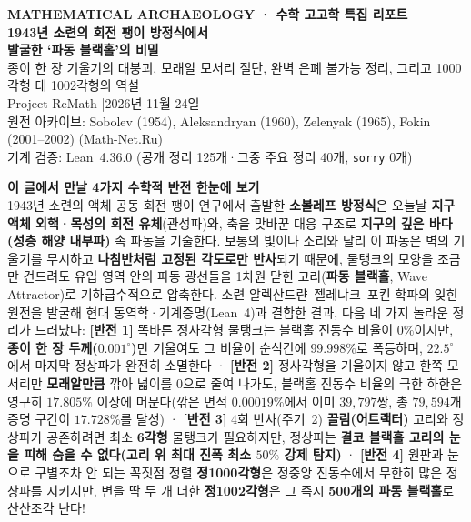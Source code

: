 \documentclass[11pt,a4paper]{article}
\begin{document}
\begin{center}
  {\sffamily\footnotesize\bfseries\color{teal} MATHEMATICAL ARCHAEOLOGY · 수학 고고학 특집 리포트}\\[0.55em]
  {\sffamily\huge\bfseries\color{navy} 1943년 소련의 회전 팽이 방정식에서\\[0.18em] 발굴한 `파동 블랙홀'의 비밀}\\[0.5em]
  {\sffamily\large\color{darkgray} 종이 한 장 기울기의 대붕괴, 모래알 모서리 절단, 완벽 은폐 불가능 정리, 그리고 1000각형 대 1002각형의 역설}\\[0.9em]
  {\sffamily\small Project ReMath \quad|\quad 2026년 11월 24일}\\[0.25em]
  {\footnotesize\color{gray} 원전 아카이브: Sobolev (1954), Aleksandryan (1960), Zelenyak (1965), Fokin (2001--2002) (Math-Net.Ru)\\기계 검증: Lean~4.36.0 (공개 정리 125개·그중 주요 정리 40개, \texttt{sorry} 0개)}
\end{center}

\vspace{0.35em}

\begin{tcolorbox}[colback=softbg,colframe=navy,boxrule=0.7pt,arc=3pt,left=12pt,right=12pt,top=8pt,bottom=8pt]
\textbf{\sffamily 이 글에서 만날 4가지 수학적 반전 한눈에 보기}\\[0.25em]
1943년 소련의 액체 공동 회전 팽이 연구에서 출발한 \textbf{소볼레프 방정식}은 오늘날 \textbf{지구 액체 외핵·목성의 회전 유체}(관성파)와, 축을 맞바꾼 대응 구조로 \textbf{지구의 깊은 바다(성층 해양 내부파)} 속 파동을 기술한다. 보통의 빛이나 소리와 달리 이 파동은 벽의 기울기를 무시하고 \textbf{나침반처럼 고정된 각도로만 반사}되기 때문에, 물탱크의 모양을 조금만 건드려도 유입 영역 안의 파동 광선들을 1차원 닫힌 고리(\textbf{파동 블랙홀}, Wave Attractor)로 기하급수적으로 압축한다. 소련 알렉산드랸--젤레냐크--포킨 학파의 잊힌 원전을 발굴해 현대 동역학·기계증명(Lean~4)과 결합한 결과, 다음 네 가지 놀라운 정리가 드러났다:
\textbf{[반전 1]} 똑바른 정사각형 물탱크는 블랙홀 진동수 비율이 $0\%$이지만, \textbf{종이 한 장 두께($0.001^\circ$)}만 기울여도 그 비율이 순식간에 \textbf{$99.998\%$}로 폭등하며, $22.5^\circ$에서 마지막 정상파가 완전히 소멸한다 ·
\textbf{[반전 2]} 정사각형을 기울이지 않고 한쪽 모서리만 \textbf{모래알만큼} 깎아 넓이를 $0$으로 줄여 나가도, 블랙홀 진동수 비율의 극한 하한은 영구히 \textbf{$17.805\%$} 이상에 머문다(깎은 면적 $0.00019\%$에서 이미 $39{,}797$쌍, 총 $79{,}594$개 증명 구간이 $17.728\%$를 달성) ·
\textbf{[반전 3]} 4회 반사(주기~2) \textbf{끌림(어트랙터)} 고리와 정상파가 공존하려면 최소 \textbf{6각형} 물탱크가 필요하지만, 정상파는 \textbf{결코 블랙홀 고리의 눈을 피해 숨을 수 없다(고리 위 최대 진폭 최소 $50\%$ 강제 탐지)} ·
\textbf{[반전 4]} 원판과 눈으로 구별조차 안 되는 꼭짓점 정렬 \textbf{정1000각형}은 정중앙 진동수에서 무한히 많은 정상파를 지키지만, 변을 딱 두 개 더한 \textbf{정1002각형}은 그 즉시 \textbf{500개의 파동 블랙홀}로 산산조각 난다!
\end{tcolorbox}
\end{document}
